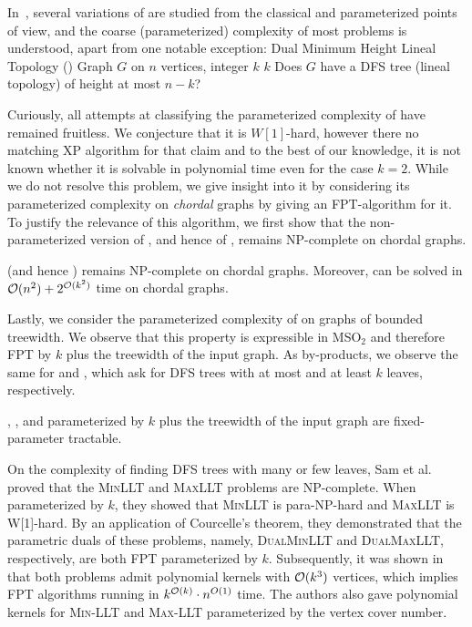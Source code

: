 \documentclass[a4paper,11pt]{article}
\begin{document}
In~\cite{SamFRG23}, several variations of \MinHProb are studied from the classical and parameterized points of view, and the coarse (parameterized) complexity of most problems is understood, apart from one notable exception: 
%
\fancyparproblemdef
    {Dual Minimum Height Lineal Topology (\DualMinHProb)}
    {Graph $G$ on $n$ vertices, integer $k$}
    {$k$}
    {Does $G$ have a DFS tree (lineal topology) of height at most $n-k$?}

Curiously, all attempts at classifying the parameterized complexity of 
\DualMinHProb have remained fruitless. 
We conjecture that it is $W[1]$-hard, however there no matching XP algorithm 
for that claim and to the best of our knowledge, 
it is not known whether it is solvable in polynomial time even for the case $k=2$. 
%
While we do not resolve this problem, we give insight into it by considering its parameterized complexity on \emph{chordal} graphs by giving an FPT-algorithm for it.
%
To justify the relevance of this algorithm, we first show that the non-parameterized version of \MinHProb, and hence of \DualMinHProb, remains NP-complete on chordal graphs.
%
\begin{theorem}
    \MinHProb (and hence \DualMinHProb) remains NP-complete on chordal graphs. 
    Moreover, \DualMinHProb can be solved in ${\mathcal{O}}(n^2) + 2^{{\mathcal{O}}(k^2)}$ time on chordal graphs.
\end{theorem}

Lastly, we consider the parameterized complexity of \DualMinHProb on 
graphs of bounded treewidth.
We observe that this property is expressible in MSO$_2$ and therefore FPT by $k$ plus the treewidth of the input graph.
As by-products, we observe the same for 
\MinLLTProb and \MaxLLTProb,
which ask for DFS trees with at most and at least $k$ leaves, respectively.
%
\begin{theorem}\label{thm:mso}
    \DualMinHProb, \MinLLTProb, and \MaxLLTProb parameterized by $k$ plus the treewidth of the input graph are fixed-parameter tractable.
\end{theorem}

On the complexity of finding DFS trees with many or few leaves, Sam et al.~\cite{SamFRG23} proved that the \textsc{MinLLT} and \textsc{MaxLLT} problems are NP-complete. When parameterized by $k$, they showed that \textsc{MinLLT} is para-NP-hard and \textsc{MaxLLT} is W[1]-hard. By an application of Courcelle's theorem, they demonstrated that the parametric duals of these problems, namely, \textsc{DualMinLLT} and \textsc{DualMaxLLT}, respectively, are both FPT parameterized by $k$. Subsequently, it was shown in \cite{SamBPN23} that both problems admit polynomial kernels with ${\mathcal{O}}(k^3)$ vertices, which implies FPT algorithms running in  $k^{{\mathcal{O}}(k)}\cdot n^{O(1)}$ time. The authors also gave polynomial kernels for \textsc{Min-LLT} and \textsc{Max-LLT} parameterized by the vertex cover number. 
\end{document}
